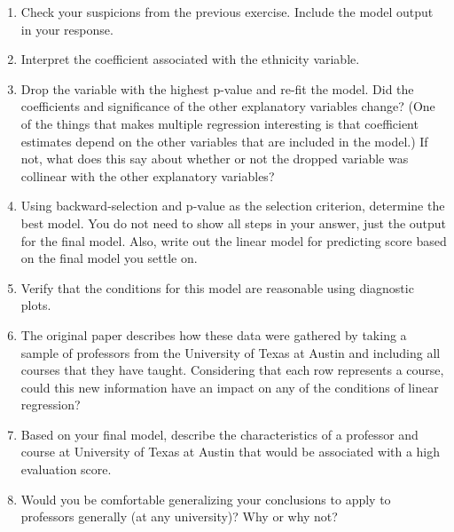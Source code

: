 \documentclass[
]{article}
\begin{document}
\begin{enumerate}
\def\labelenumi{\arabic{enumi}.}
\setcounter{enumi}{11}
\item
  Check your suspicions from the previous exercise. Include the model
  output in your response.
\item
  Interpret the coefficient associated with the ethnicity variable.
\item
  Drop the variable with the highest p-value and re-fit the model. Did
  the coefficients and significance of the other explanatory variables
  change? (One of the things that makes multiple regression interesting
  is that coefficient estimates depend on the other variables that are
  included in the model.) If not, what does this say about whether or
  not the dropped variable was collinear with the other explanatory
  variables?
\item
  Using backward-selection and p-value as the selection criterion,
  determine the best model. You do not need to show all steps in your
  answer, just the output for the final model. Also, write out the
  linear model for predicting score based on the final model you settle
  on.
\item
  Verify that the conditions for this model are reasonable using
  diagnostic plots.
\item
  The original paper describes how these data were gathered by taking a
  sample of professors from the University of Texas at Austin and
  including all courses that they have taught. Considering that each row
  represents a course, could this new information have an impact on any
  of the conditions of linear regression?
\item
  Based on your final model, describe the characteristics of a professor
  and course at University of Texas at Austin that would be associated
  with a high evaluation score.
\item
  Would you be comfortable generalizing your conclusions to apply to
  professors generally (at any university)? Why or why not?
\end{enumerate}
\end{document}
